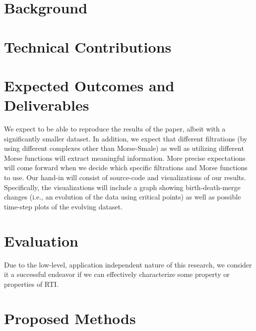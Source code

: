 \documentclass[12pt, fullpage,letterpaper]{article}
\begin{document}
	\section*{\normalfont Background} 
	
	  
	\section*{\normalfont Technical Contributions} 
	
	
	\section*{\normalfont Expected Outcomes and Deliverables}  
We expect to be able to reproduce the results of the paper, albeit with a significantly smaller dataset. In addition, we expect that different filtrations (by using different complexes other than Morse-Smale) as well as utilizing different Morse functions will extract meaningful information. More precise expectations will come forward when we decide which specific filtrations and  Morse functions to use. Our hand-in will consist of source-code and visualizations of our results. Specifically, the visualizations will include a graph showing birth-death-merge changes (i.e., an evolution of the data using critical points) as well as possible time-step plots of the evolving dataset.
	
	\section*{\normalfont Evaluation}  
	Due to the low-level, application independent nature of this research, we consider it a successful endeavor if we can effectively characterize some property or properties of RTI. 
	
	
	\section*{\normalfont Proposed Methods}  
\end{document}
